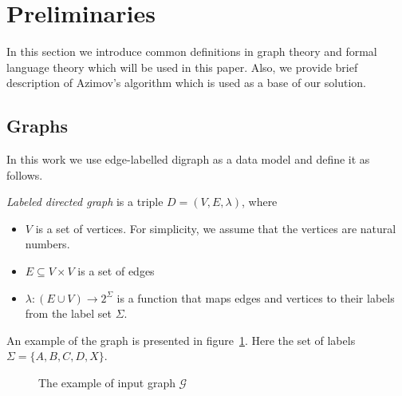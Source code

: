 \section{Preliminaries}

In this section we introduce common definitions in graph theory and formal language theory which will be used in this paper. 
Also, we provide brief description of Azimov's algorithm which is used as a base of our solution.

\subsection{Graphs}

In this work we use edge-labelled digraph as a data model and define it as follows.
\begin{definition} \emph{Labeled directed graph} is a triple $D = (V, E, \lambda)$, where
\begin{itemize}
    \item $V$ is a set of vertices. For simplicity, we assume that the vertices are natural numbers.
    \item $E \subseteq V \times V$ is a set of edges
    \item $\lambda : (E\cup V) \xrightarrow{} 2^\Sigma$ is a function that maps edges and vertices to their labels from the label set $\Sigma$.
\end{itemize}
\end{definition}

An example of the graph is presented in figure~\ref{fig:example_input_graph}. Here the set of labels $\Sigma = \{A, B, C, D, X\}$.

\begin{figure}[h]
    \centering        
    \caption{The example of input graph $\mathcal{G}$}
    \label{fig:example_input_graph}
\end{figure}

